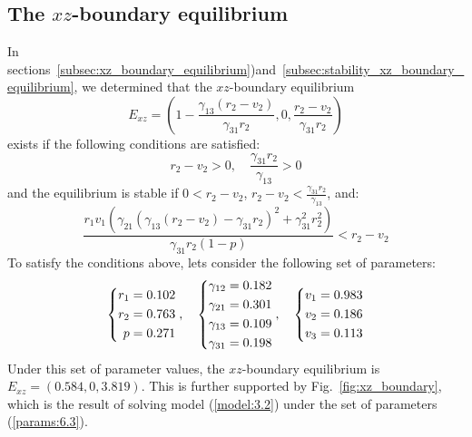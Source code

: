 \subsection{The $xz$-boundary equilibrium}\label{subsec:numsim_xz_boundary_equilibrium}
In sections~\ref{subsec:xz_boundary_equilibrium})and~\ref{subsec:stability_xz_boundary_equilibrium}, we determined that the $xz$-boundary equilibrium
\[
E_{xz}=\left(1-\frac{\gamma_{13}\left(r_2-v_2\right)}{\gamma_{31}r_2},0,\frac{r_2-v_2}{\gamma_{31}r_2}\right)
\]
exists if the following conditions are satisfied:
\[
r_2-v_2>0,\quad \frac{\gamma_{31}r_2}{\gamma_{13}}>0
\]
and the equilibrium is stable if $0<r_2-v_2$, $\displaystyle r_2-v_2<\frac{\gamma_{31}r_2}{\gamma_{13}}$, and:
\[
\frac{r_1v_1\left(\gamma_{21}\left(\gamma_{13}\left(r_2-v_2\right)-\gamma_{31}r_2\right)^2+\gamma_{31}^2r_2^2\right)}{\gamma_{31}r_2\left(1-p\right)}<r_2-v_2
\]
To satisfy the conditions above, lets consider the following set of parameters:
\begin{equation}
    \begin{dcases}
        \begin{aligned}
            r_1 &= 0.102\\
            r_2 &= 0.763\\
            p &= 0.271
        \end{aligned}
    \end{dcases},\quad 
    \begin{dcases}
        \begin{aligned}
            \gamma_{12} &= 0.182\\
            \gamma_{21} &= 0.301\\
            \gamma_{13} &= 0.109\\
            \gamma_{31} &= 0.198
        \end{aligned}
    \end{dcases},\quad
    \begin{dcases}
        \begin{aligned}
            v_1 &= 0.983\\
            v_2 &= 0.186\\
            v_3 &= 0.113
        \end{aligned}
    \end{dcases} 
    \label{params:6.3}
\end{equation}
Under this set of parameter values, the $xz$-boundary equilibrium is $E_{xz}=(0.584,0,3.819)$. This is further supported by Fig.~\ref{fig:xz_boundary}, which is the result of solving model (\ref{model:3.2}) under the set of parameters (\ref{params:6.3}).

